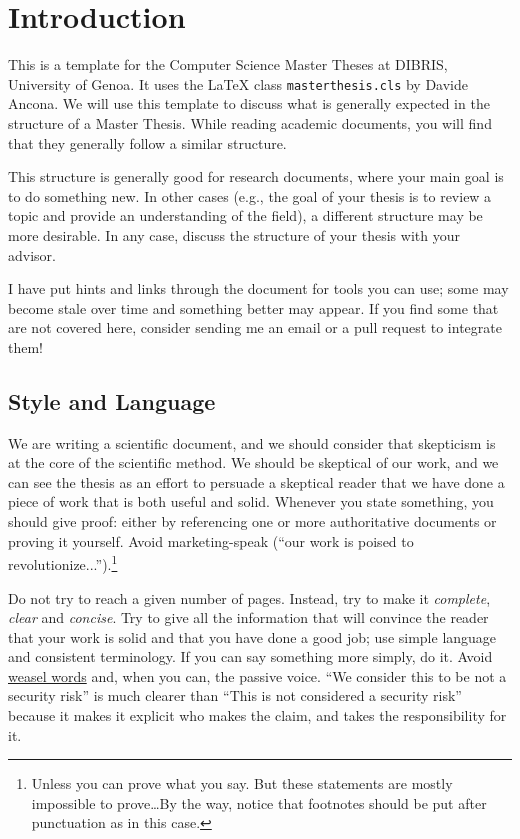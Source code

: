 \chapter{Introduction}
\label{sec:introduction}

This is a template for the Computer Science Master Theses at \ac{DIBRIS},
University of Genoa. It uses the \xspace{\LaTeX} class \texttt{masterthesis.cls} by
Davide Ancona. We will use this template to discuss what is generally expected in the
structure of a Master Thesis. While reading academic documents, you will find that
they generally follow a similar structure.

This structure is generally good for research documents, where your main goal is to do
something new. In other cases (e.g., the goal of your thesis is to review a topic and provide
an understanding of the field), a different structure may be more desirable. In any case,
discuss the structure of your thesis with your advisor.

I have put hints and links through the document for tools you can use; some may become stale over time and something better may appear. If you find some that are not covered here, consider sending me an email or a pull request to integrate them!

\section{Style and Language}

We are writing a scientific document, and we should consider that skepticism
is at the core of the scientific method. We should be skeptical of our work, and
we can see the thesis as an effort to persuade a skeptical reader that we have done
a piece of work that is both useful and solid. Whenever you state something, you should give proof:
either by referencing one or more authoritative documents or proving it yourself.
Avoid marketing-speak (``our work is poised to revolutionize...'').\footnote{Unless you can
prove what you say. But these statements are mostly impossible to prove\ldots By the
way, notice that footnotes should be put after punctuation as in this case.}

Do not try to reach a given number of pages. Instead, try to make it
\emph{complete}, \emph{clear} and \emph{concise}. Try to give all the information that will
convince the reader that your work is solid and that you have done a good job; use simple
language and consistent terminology.
If you can say something more simply, do it. Avoid
\href{https://en.wikipedia.org/wiki/Weasel_word}{weasel words} and, when you can, the passive voice.
``We consider this to be not a security risk'' is much clearer than ``This is not considered a
security risk'' because it makes it explicit who makes the claim, and takes the responsibility for
it.

